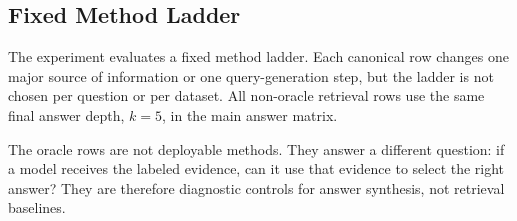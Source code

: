 \subsection{Fixed Method Ladder}
The experiment evaluates a fixed method ladder. Each canonical row
changes one major source of information or one query-generation step, but the
ladder is not chosen per question or per dataset. All non-oracle retrieval rows
use the same final answer depth, $k=5$, in the main answer matrix.

The oracle rows are not deployable methods. They answer a different question:
if a model receives the labeled evidence, can it use that evidence to select
the right answer? They are therefore diagnostic controls for answer synthesis,
not retrieval baselines.

